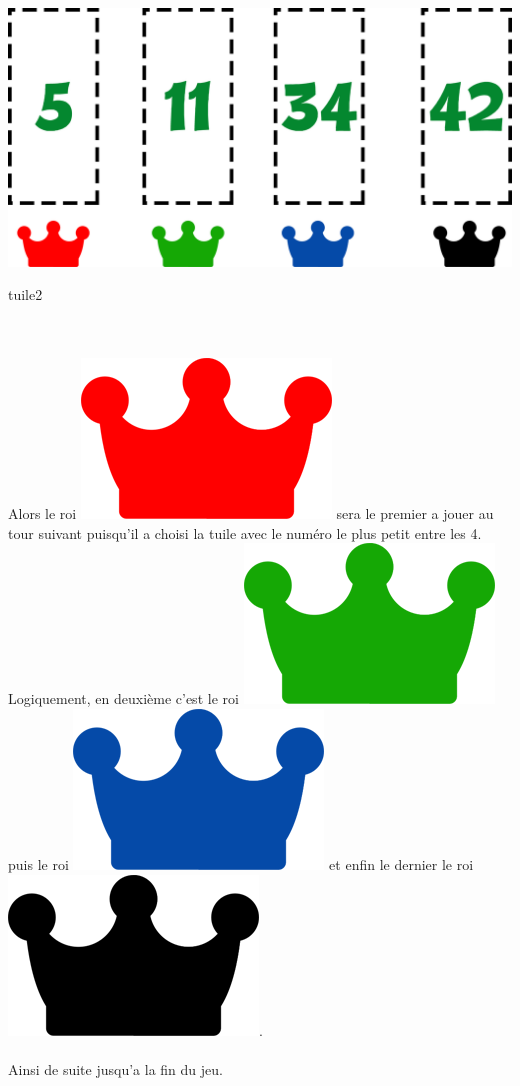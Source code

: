 \begin{center}
  \includegraphics[scale=0.5]{Figures/tuileroi.png}
  \caption{tuile2}
\end{center}
\\ \\
Alors le roi  \includegraphics[scale=0.3]{Figures/roirouge.png} sera le premier a jouer au tour suivant puisqu'il a choisi la tuile avec le numéro le plus petit entre les 4.
Logiquement, en deuxième c'est le roi \includegraphics[scale=0.3]{Figures/roivert.png} puis le roi \includegraphics[scale=0.3]{Figures/roibleu.png} et enfin le dernier le roi \includegraphics[scale=0.3]{Figures/roinoir.png}.\\
\\
Ainsi de suite jusqu'a la fin du jeu.

